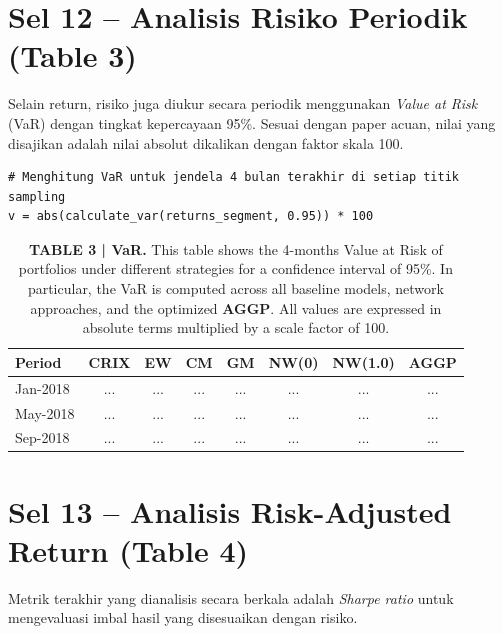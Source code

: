 \documentclass[12pt,a4paper]{article}
\begin{document}
\section{Sel 12 -- Analisis Risiko Periodik (Table 3)}
Selain return, risiko juga diukur secara periodik menggunakan \textit{Value at Risk} (VaR) dengan tingkat kepercayaan 95\%. Sesuai dengan paper acuan, nilai yang disajikan adalah nilai absolut dikalikan dengan faktor skala 100.

\begin{lstlisting}[caption={Kalkulasi VaR 95\% Periodik}]
# Menghitung VaR untuk jendela 4 bulan terakhir di setiap titik sampling
v = abs(calculate_var(returns_segment, 0.95)) * 100
\end{lstlisting}

\begin{table}[h]
    \centering
    \footnotesize
    \caption{\textbf{TABLE 3 | VaR.} This table shows the 4-months Value at Risk of portfolios under different strategies for a confidence interval of 95\%. In particular, the VaR is computed across all baseline models, network approaches, and the optimized \textbf{AGGP}. All values are expressed in absolute terms multiplied by a scale factor of 100.}
    \begin{tabular}{lccccccc}
        \toprule
        Period & CRIX & EW & CM & GM & NW(0) & NW(1.0) & AGGP \\
        \midrule
        Jan-2018 & ... & ... & ... & ... & ... & ... & ... \\
        May-2018 & ... & ... & ... & ... & ... & ... & ... \\
        Sep-2018 & ... & ... & ... & ... & ... & ... & ... \\
        \bottomrule
    \end{tabular}
\end{table}

\section{Sel 13 -- Analisis Risk-Adjusted Return (Table 4)}
Metrik terakhir yang dianalisis secara berkala adalah \textit{Sharpe ratio} untuk mengevaluasi imbal hasil yang disesuaikan dengan risiko.
\end{document}
